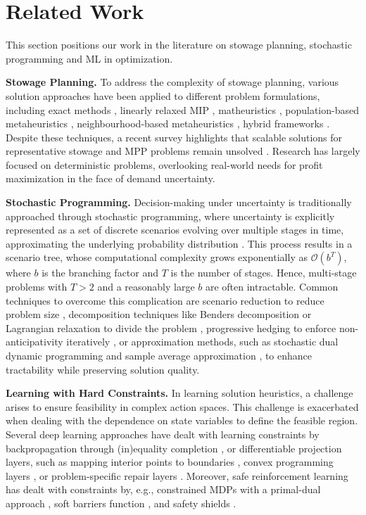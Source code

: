 \section{Related Work}
This section positions our work in the literature on stowage planning, stochastic programming and ML in optimization.  

\textbf{Stowage Planning.} To address the complexity of stowage planning, various solution approaches have been applied to different problem formulations, including exact methods \cite{roberti_decomposition_2018}, linearly relaxed MIP \cite{pacino_fast_2011}, matheuristics \cite{parreno-torres_solving_2021}, population-based metaheuristics \cite{chang_solving_2022}, neighbourhood-based metaheuristics \cite{pacino_crane_2018}, hybrid frameworks \cite{bilican_mathematical_2020}. 
Despite these techniques, a recent survey highlights that scalable solutions for representative stowage and MPP problems remain unsolved \cite{van_twiller_literature_2024}. Research has largely focused on deterministic problems, overlooking real-world needs for profit maximization in the face of demand uncertainty. 

\textbf{Stochastic Programming.} Decision-making under uncertainty is traditionally approached through stochastic programming, where uncertainty is explicitly represented as a set of discrete scenarios evolving over multiple stages in time, approximating the underlying probability distribution \cite{birge_introduction_2011}. This process results in a scenario tree, whose computational complexity grows exponentially as $\mathcal{O}(b^T)$, where $b$ is the branching factor and $T$ is the number of stages. Hence, multi-stage problems with $T > 2$ and a reasonably large $b$ are often intractable. Common techniques to overcome this complication are scenario reduction to reduce problem size \cite{watanabe_scenario_2009}, decomposition techniques like Benders decomposition or Lagrangian relaxation to divide the problem \cite{rahmaniani_benders_2017}, progressive hedging to enforce non-anticipativity iteratively \cite{boland_combining_2018}, or approximation methods, such as stochastic dual dynamic programming \cite{shapiro_analysis_2011} and sample average approximation \cite{chen_sample_2022}, to enhance tractability while preserving solution quality.

\textbf{Learning with Hard Constraints.} In learning solution heuristics, a challenge arises to ensure feasibility in complex action spaces. This challenge is exacerbated when dealing with the dependence on state variables to define the feasible region. Several deep learning approaches have dealt with learning constraints by backpropagation through (in)equality completion \cite{donti_dc3_2021}, or differentiable projection layers, such as mapping interior points to boundaries \cite{li_learning_2023},  convex programming layers \cite{agrawal_differentiable_2019}, or problem-specific repair layers \cite{chen_end--end_2024}. Moreover, safe reinforcement learning has dealt with constraints by, e.g., constrained MDPs with a primal-dual approach \cite{ding_natural_2020}, soft barriers function \cite{wang_enforcing_2023}, and safety shields \cite{alshiekh_safe_2018}.